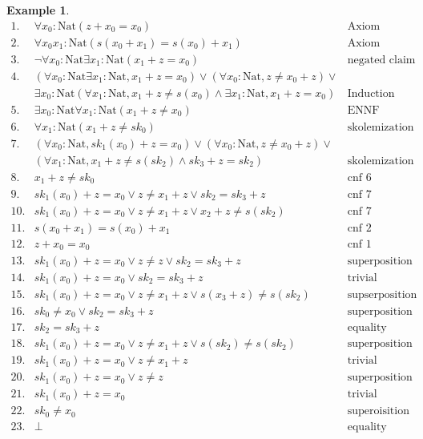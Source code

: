 \documentclass[onehalfspacing]{article}
\newtheorem{example}[theorem]{Example}
\begin{document}
\begin{example}\hfill
	\begin{align*}
		1. &\forall x_0 : \text{Nat}(z + x_0 = x_0) & \text{Axiom}\\
		2.&\forall x_0x_1: \text{Nat}(s(x_0 + x_1) = s(x_0) + x_1) & \text{Axiom}\\
		3.&\neg\forall x_0 : \text{Nat}\exists x_1:\text{Nat}(x_1 + z = x_0) & \text{negated claim}\\
		4.&(\forall x_0:\text{Nat}\exists x_1:\text{Nat}, x_1 + z = x_0)\vee(\forall x_0:\text{Nat},z\neq x_0 + z)\vee&\\
		&\exists x_0:\text{Nat}(\forall x_1:\text{Nat}, x_1 + z\neq s(x_0)\wedge \exists x_1:\text{Nat}, x_1+z=x_0)&\text{Induction axiom (ENNF)}\\
		5.&\exists x_0: \text{Nat}\forall x_1: \text{Nat}(x_1 + z \neq x_0) & \text{ENNF transformation 3}\\
		6.&\forall x_1: \text{Nat}(x_1 + z \neq sk_0) & \text{skolemization 5}\\
		7.&(\forall x_0:\text{Nat}, sk_1(x_0) + z = x_0)\vee(\forall x_0:\text{Nat},z\neq x_0 + z)\vee&\\
		&(\forall x_1:\text{Nat}, x_1 + z\neq s(sk_2)\wedge sk_3+z=sk_2)&\text{skolemization 4}\\
		8.&x_1 + z\neq sk_0&\text{cnf 6}\\
		9.&sk_1(x_0) + z = x_0\vee z\neq x_1 + z\vee sk_2 = sk_3 + z&\text{cnf 7}\\
		10.&sk_1(x_0) + z = x_0\vee z\neq x_1 + z\vee x_2 + z\neq s(sk_2)&\text{cnf 7}\\
		11.&s(x_0 + x_1) = s(x_0) + x_1&\text{cnf 2}\\
		12.&z + x_0 = x_0&\text{cnf 1}\\
		13.&sk_1(x_0) + z = x_0\vee z\neq z\vee sk_2 = sk_3 + z&\text{superposition 9, 12}\\
		14.&sk_1(x_0) + z = x_0\vee sk_2 = sk_3 + z&\text{trivial inequality removal 13}\\
		15.&sk_1(x_0) + z = x_0\vee z\neq x_1 + z\vee s(x_3 + z)\neq s(sk_2)&\text{supserposition 10, 11}\\
		16.&sk_0\neq x_0\vee sk_2 = sk_3 + z&\text{superposition 8, 14}\\
		17.&sk_2 = sk_3 + z&\text{equality resolution 16}\\
		18.&sk_1(x_0) + z = x_0\vee z\neq x_1 + z\vee s(sk_2)\neq s(sk_2)&\text{superposition 15, 17}\\
		19.&sk_1(x_0) + z = x_0\vee z\neq x_1 + z&\text{trivial inequality removal 18}\\
		20.&sk_1(x_0) + z = x_0\vee z\neq z&\text{superposition 12, 19}\\
		21.&sk_1(x_0) + z = x_0&\text{trivial inequality removal 20}\\
		22.&sk_0 \neq x_0&\text{superoisition 21, 8}\\
		23.&\bot&\text{equality resolution 22}
	\end{align*}
\end{example}
\end{document}
